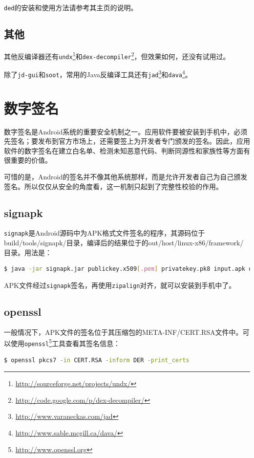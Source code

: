 \lstinline!ded!的安装和使用方法请参考其主页的说明。

\subsection{其他}
其他反编译器还有\lstinline!undx!\footnote{\url{http://sourceforge.net/projects/undx/}}和\lstinline!dex-decompiler!\footnote{\url{http://code.google.com/p/dex-decompiler/}}，但效果如何，还没有试用过。

除了\lstinline!jd-gui!和\lstinline!soot!，常用的Java反编译工具还有\lstinline!jad!\footnote{\url{http://www.varaneckas.com/jad}}和\lstinline!dava!\footnote{\url{http://www.sable.mcgill.ca/dava/}}。

\section{数字签名}
数字签名是Android系统的重要安全机制之一。应用软件要被安装到手机中，必须先签名；要发布到官方市场上，还需要签上为开发者专门颁发的签名。因此，应用软件的数字签名在建立白名单、检测未知恶意代码、判断同源性和家族性等方面有很重要的价值。

可惜的是，Android的签名并不像其他系统那样，而是允许开发者自己为自己颁发签名。所以仅仅从安全的角度看，这一机制只起到了完整性校验的作用。

\subsection{signapk}
\lstinline!signapk!是Android源码中为APK格式文件签名的程序，其源码位于build/tools/signapk/目录，编译后的结果位于的out/host/linux-x86/framework/目录。用法是：
\begin{lstlisting}[language=bash, numbers=none]
 $ java -jar signapk.jar publickey.x509[.pem] privatekey.pk8 input.apk output.apk
\end{lstlisting}
APK文件经过\lstinline!signapk!签名，再使用\lstinline!zipalign!对齐，就可以安装到手机中了。

\subsection{openssl}
一般情况下，APK文件的签名位于其压缩包的META-INF/CERT.RSA文件中。可以使用\lstinline!openssl!\footnote{\url{http://www.openssl.org}}工具查看其签名信息：
\begin{lstlisting}[language=bash, numbers=none]
 $ openssl pkcs7 -in CERT.RSA -inform DER -print_certs
\end{lstlisting}

